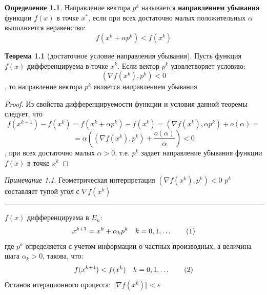 \documentclass[oneside]{book}
\newcommand\addtag{\refstepcounter{equation}\tag{\theequation}}
\theoremstyle{plain}
\theoremstyle{remark}
\newtheorem*{remark}{Примечание}
\theoremstyle{definition}
\newtheorem{theorem}{Теорема}[section]
\newtheorem*{definition}{Определение}
\begin{document}
\chapter{}
\label{sec:org335bf1e}
\begin{definition}
Направление вектора \(p^k\) называется \textbf{направлением убывания} функции \(f(x)\) в точке \(x^*\), если при всех достаточно малых положительных \(\alpha\) выполняется неравенство: \[f(x^k + \alpha p^k)  < f(x^k)\]
\end{definition}
\begin{theorem}[достаточное условие направления убывания]
Пусть функция \(f(x)\) дифференцируема в точке \(x^k\). Если вектор \(p^k\) удовлетворяет условию:
\[ (\nabla f(x^k), p^k) < 0 \]
, то направление вектора \(p^k\) является направлением убывания
\end{theorem}
\begin{proof}
Из свойства дифференцируемости функции и условия данной теоремы следует, что \[f(x^{k + 1}) - f(x^k) = f(x^k + \alpha p^k) - f(x^k) = (\nabla f(x^k), \alpha p^k) + o(\alpha) = \]
\[ = \alpha \left((\nabla f(x^k), p^k) + \frac{o(\alpha)}{\alpha}\right) < 0 \]
, при всех достаточно малых \(\alpha > 0\), т.е. \(p^k\) задает направление убывания функции \(f(x)\) в точке \(x^k\)
\end{proof}
\begin{remark}
Геометрическая интерпретация \((\nabla f(x^k), p^k) < 0\) \implies \(p^k\) составляет тупой угол с \(\nabla f(x^k)\)
\end{remark}

\noindent\rule{\textwidth}{0.5pt}
\(f(x)\) дифференцируема в \(E_n\):
\[ x^{k + 1} = x^k + \alpha_k p^k \quad k = 0,1,\dots \addtag\label{11_8}\]
где \(p^k\) определяется с учетом информации о частных производных, а величина шага \(\alpha_k > 0\), такова, что:
\[ f(x^{k + 1}) < f(x^k) \quad k = 0,1,\dots \addtag\label{12_8}\]
Останов итерационного процесса: \(\Vert \nabla f(x^k) \Vert < \varepsilon\)
\end{document}

